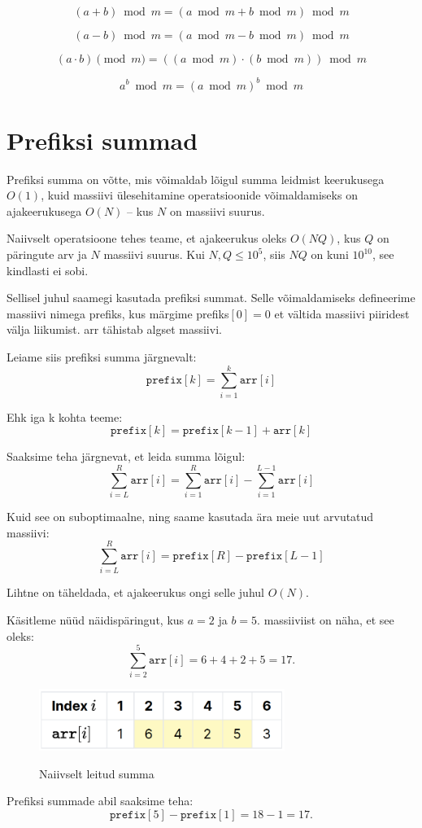 \documentclass{trkut}
\begin{document}
\begin{appendices}
$$(a+b) \bmod m = (a \bmod m + b \bmod m) \bmod m$$

$$(a-b) \bmod m = (a \bmod m - b \bmod m) \bmod m$$

$$(a \cdot b) \pmod{m} = ((a \bmod m) \cdot (b \bmod m)) \bmod m$$

$$a^b \bmod {m} = (a \bmod m)^b \bmod m$$


 \chapter{Prefiksi summad}\label{lisa11}
    \tiny
    \normalsize
Prefiksi summa on võtte, mis võimaldab lõigul summa leidmist keerukusega $O(1)$, kuid massiivi ülesehitamine operatsioonide võimaldamiseks on ajakeerukusega $O(N)$ -- kus $N$ on massiivi suurus.

Naiivselt operatsioone tehes teame, et ajakeerukus oleks $O(NQ)$, kus $Q$ on päringute arv ja $N$ massiivi suurus.
Kui $N, Q \leq 10^5$, siis $NQ$ on kuni $10^{10}$, see kindlasti ei sobi.

Sellisel juhul saamegi kasutada prefiksi summat.
Selle võimaldamiseks defineerime massiivi nimega prefiks, kus märgime prefiks$[0]=0$ et vältida massiivi piiridest välja liikumist.
arr tähistab algset massiivi.

Leiame siis prefiksi summa järgnevalt:
$$
\texttt{prefix}[k]=\sum_{i=1}^{k} \texttt{arr}[i]
$$

Ehk iga k kohta teeme:
$$
\texttt{prefix}[k]=\texttt{prefix}[k-1]+\texttt{arr}[k]
$$

Saaksime teha järgnevat, et leida summa lõigul: 
$$
\sum_{i=L}^{R} \texttt{arr}[i] = \sum_{i=1}^{R} \texttt{arr}[i] - \sum_{i=1}^{L-1} \texttt{arr}[i]
$$

Kuid see on suboptimaalne, ning saame kasutada ära meie uut arvutatud massiivi: 
$$
\sum_{i=L}^{R} \texttt{arr}[i]= \texttt{prefix}[R]-\texttt{prefix}[L-1]
$$

Lihtne on täheldada, et ajakeerukus ongi selle juhul $O(N)$.

Käsitleme nüüd näidispäringut, kus $a = 2$ ja $b = 5$.
massiiviist on näha, et see oleks:
$$
\sum_{i=2}^{5} \texttt{arr}[i] = 6 + 4 + 2 + 5 = 17.
$$
\begin{figure}[H]%
    \includegraphics[width=8cm]{PrefixMassiiv1.png}%
    \caption{Naiivselt leitud summa}%
    \label{EMaxx}%
\end{figure}
Prefiksi summade abil saaksime teha:
$$
\texttt{prefix}[5] - \texttt{prefix}[1] = 18 - 1 = 17.
$$


\end{appendices}
\end{document}
